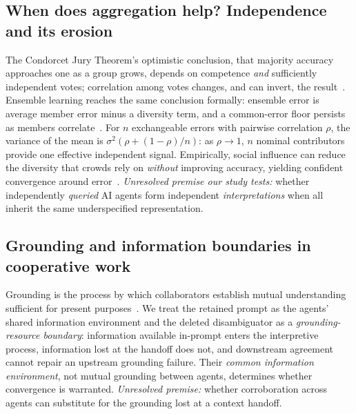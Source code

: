 \documentclass[acmsmall,screen,nonacm]{acmart}
\begin{document}
\subsection{When does aggregation help? Independence and its erosion}
The Condorcet Jury Theorem's optimistic conclusion, that majority accuracy approaches one as a group
grows, depends on competence \emph{and} sufficiently independent votes; correlation among votes changes,
and can invert, the result~\cite{condorcet,ladha1992,dietrich2013}. Ensemble learning reaches the same
conclusion formally: ensemble error is average member error minus a diversity term, and a common-error
floor persists as members correlate~\cite{krogh1994,tumer1996,breiman2001}. For $n$ exchangeable errors
with pairwise correlation $\rho$, the variance of the mean is $\sigma^2(\rho + (1-\rho)/n)$: as
$\rho\!\to\!1$, $n$ nominal contributors provide one effective independent signal. Empirically, social
influence can reduce the diversity that crowds rely on \emph{without} improving accuracy, yielding confident
convergence around error~\cite{lorenz2011}. \emph{Unresolved premise our study tests:} whether independently
\emph{queried} AI agents form independent \emph{interpretations} when all inherit the same underspecified
representation.

\subsection{Grounding and information boundaries in cooperative work}
Grounding is the process by which collaborators establish mutual understanding sufficient for present
purposes~\cite{clark1991grounding}. We treat the retained prompt as the agents' shared information
environment and the deleted disambiguator as a \emph{grounding-resource boundary}: information available
in-prompt enters the interpretive process, information lost at the handoff does not, and downstream
agreement cannot repair an upstream grounding failure. Their \emph{common information environment}, not
mutual grounding between agents, determines whether convergence is warranted. \emph{Unresolved premise:} whether corroboration across agents can substitute for
the grounding lost at a context handoff.
\end{document}
